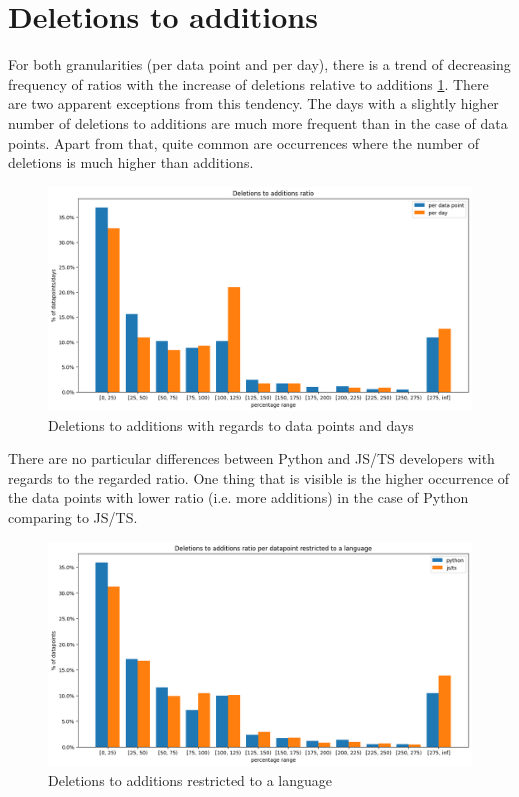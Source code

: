 \section{Deletions to additions}

For both granularities (per data point and per day), there is a trend of decreasing frequency of ratios with the increase of deletions relative to additions \ref{fig:del_to_add}. There are two apparent exceptions from this tendency. The days with a slightly higher number of deletions to additions are much more frequent than in the case of data points. Apart from that, quite common are occurrences where the number of deletions is much higher than additions.

\begin{figure}[htbp]
  \centering
  \includegraphics[scale=0.5]{chapters/results/graphics/del-to-add.png}
  \caption{Deletions to additions with regards to data points and days}
  \label{fig:del_to_add}
\end{figure}

There are no particular differences between Python and JS/TS developers with regards to the regarded ratio. One thing that is visible is the higher occurrence of the data points with lower ratio (i.e. more additions) in the case of Python comparing to JS/TS.

\begin{figure}[htbp]
  \centering
  \includegraphics[scale=0.5]{chapters/results/graphics/del-to-add-langs.png}
  \caption{Deletions to additions restricted to a language}
  \label{fig:del_to_add_langs}
\end{figure}
